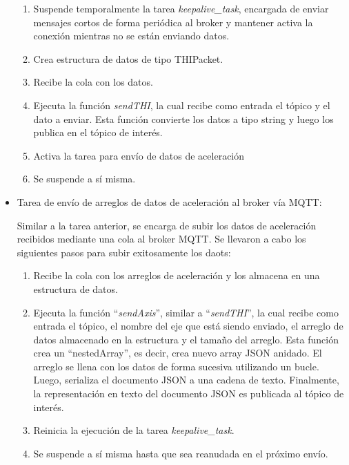 \begin{itemize}
    \begin{enumerate}
        \item Suspende temporalmente la tarea \textit{keepalive\_task}, encargada de enviar mensajes cortos de forma periódica al broker y mantener activa la conexión mientras no se están enviando datos.
        \item Crea estructura de datos de tipo THIPacket.
        \item Recibe la cola con los datos.
        \item Ejecuta la función \textit{sendTHI}, la cual recibe como entrada el tópico y el dato a enviar. Esta función convierte los datos a tipo string y luego los publica en el tópico de interés.
        \item Activa la tarea para envío de datos de aceleración
        \item Se suspende a sí misma.
    \end{enumerate}
    
    \item Tarea de envío de arreglos de datos de aceleración al broker vía MQTT:
    
    Similar a la tarea anterior, se encarga de subir los datos de aceleración recibidos mediante una cola al broker MQTT. Se llevaron a cabo los siguientes pasos para subir exitosamente los daots:

    \begin{enumerate}
        \item Recibe la cola con los arreglos de aceleración y los almacena en una estructura de datos.
        \item Ejecuta la función ``\textit{sendAxis}'', similar a ``\textit{sendTHI}'', la cual recibe como entrada el tópico, el nombre del eje que está siendo enviado, el arreglo de datos almacenado en la estructura y el tamaño del arreglo. Esta función crea un ``nestedArray'', es decir, crea nuevo array JSON anidado. El arreglo se llena con los datos de forma sucesiva utilizando un bucle. Luego, serializa el documento JSON a una cadena de texto. Finalmente, la representación en texto del documento JSON es publicada al tópico de interés.
        \item Reinicia la ejecución de la tarea \textit{keepalive\_task}.
        \item Se suspende a sí misma hasta que sea reanudada en el próximo envío.
    \end{enumerate}
    
\end{itemize}

